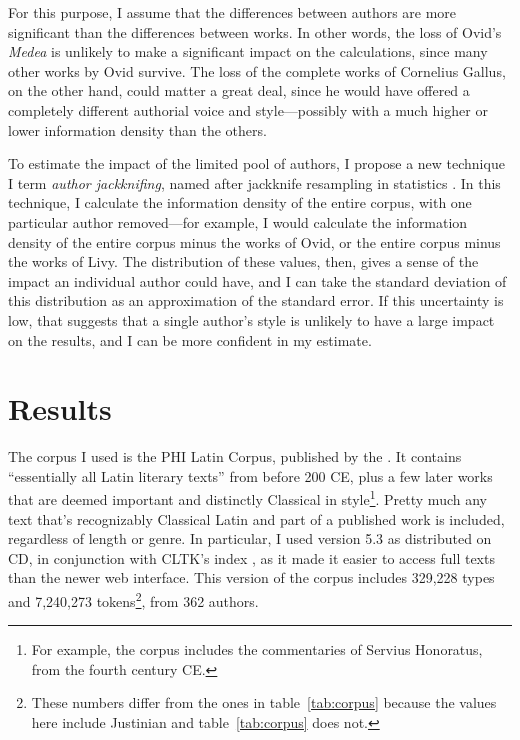\documentclass[12pt,twoside]{article}
\begin{document}
For this purpose, I assume that the differences between authors are more significant than the differences between works. In other words, the loss of Ovid's \emph{Medea} is unlikely to make a significant impact on the calculations, since many other works by Ovid survive. The loss of the complete works of Cornelius Gallus, on the other hand, could matter a great deal, since he would have offered a completely different authorial voice and style---possibly with a much higher or lower information density than the others.

To estimate the impact of the limited pool of authors, I propose a new technique I term \emph{author jackknifing}, named after jackknife resampling in statistics \citep{efron}. In this technique, I calculate the information density of the entire corpus, with one particular author removed---for example, I would calculate the information density of the entire corpus minus the works of Ovid, or the entire corpus minus the works of Livy. The distribution of these values, then, gives a sense of the impact an individual author could have, and I can take the standard deviation of this distribution as an approximation of the standard error. If this uncertainty is low, that suggests that a single author's style is unlikely to have a large impact on the results, and I can be more confident in my estimate.

\section{Results}
\label{sec:res}

The corpus I used is the PHI Latin Corpus, published by the \citet{phi}. It contains ``essentially all Latin literary texts'' from before 200 CE, plus a few later works that are deemed important and distinctly Classical in style\footnote{For example, the corpus includes the commentaries of Servius Honoratus, from the fourth century CE.}. Pretty much any text that's recognizably Classical Latin and part of a published work is included, regardless of length or genre. In particular, I used version 5.3 as distributed on CD, in conjunction with CLTK's index \citep{cltk}, as it made it easier to access full texts than the newer web interface. This version of the corpus includes 329,228 types and 7,240,273 tokens\footnote{These numbers differ from the ones in table~\ref{tab:corpus} because the values here include Justinian and table~\ref{tab:corpus} does not.}, from 362 authors.
\end{document}
